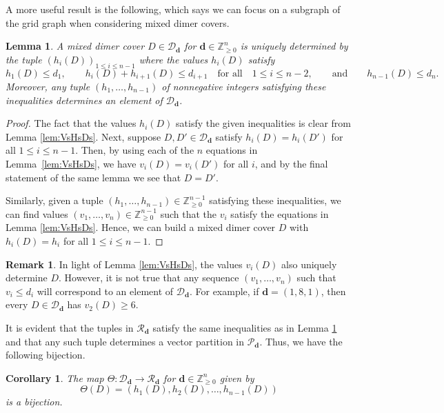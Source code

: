 \documentclass{amsart}
\def\bfd{{\mathbf{d}}}
\newtheorem{corollary}[theorem]{Corollary}
\newtheorem{lemma}[theorem]{Lemma}
\theoremstyle{definition}
\newtheorem{remark}[theorem]{Remark}
\begin{document}
A more useful result is the following, which says we can focus on a subgraph of the grid graph when considering mixed dimer covers.
 \begin{lemma}\label{lem:HoriztonalDeterminesMatching}
 A mixed dimer cover $D\in \mathcal{D}_{\mathbf{d}}$ for $\mathbf{d}\in\mathbb{Z}_{\ge 0}^n$ is uniquely determined by the tuple $(h_i(D))_{1 \leq i \leq n-1}$ where the values $h_i(D)$ satisfy \[h_1(D) \leq d_1, \qquad h_i(D) + h_{i+1}(D) \leq d_{i+1}\quad \text{for all}\quad 1 \leq i \leq n-2, \qquad \text{and} \qquad h_{n-1}(D) \leq d_n.
 \] Moreover, any tuple $(h_1,\ldots,h_{n-1})$ of nonnegative integers satisfying these inequalities determines an element of $\mathcal{D}_{\mathbf{d}}$.
 \end{lemma}

 \begin{proof}
The fact that the values $h_i(D)$ satisfy the given inequalities is clear from Lemma \ref{lem:VsHsDs}. Next, suppose $D,D' \in \mathcal{D}_{\mathbf{d}}$ satisfy $h_i(D) = h_i(D')$ for all $1 \leq i \leq n-1$. Then, by using each of the $n$ equations in Lemma~\ref{lem:VsHsDs}, we have $v_i(D) = v_i(D')$ for all $i$, and by the final statement of the same lemma we see that $D = D'$. 

Similarly, given a tuple $(h_1,\ldots,h_{n-1}) \in \mathbb{Z}_{\ge 0}^{n-1}$ satisfying these inequalities,
we can find values $(v_1,\ldots,v_n) \in \mathbb{Z}_{\ge 0}^{n-1}$ such that the $v_i$ satisfy the equations in Lemma \ref{lem:VsHsDs}. Hence, we can build a mixed dimer cover $D$ with $h_i(D) = h_i$ for all $1 \leq i \leq n-1$.
 \end{proof}

 \begin{remark}\label{rem:VsAlsoDetermine}
In light of Lemma \ref{lem:VsHsDs}, the values $v_i(D)$ also uniquely determine $D$. However, it is not true that any sequence $(v_1,\ldots,v_n)$ such that $v_i \leq d_i$ will correspond to an element of $\mathcal{D}_{\mathbf{d}}$. For example, if $\mathbf{d} = (1,8,1)$, then every $D \in \mathcal{D}_{\mathbf{d}}$ has $v_2(D) \geq 6$.
 \end{remark}

 It is evident that the tuples in $\mathcal{R}_{\mathbf{d}}$ satisfy the same inequalities as in Lemma \ref{lem:HoriztonalDeterminesMatching} and that any such tuple determines a vector partition in $\mathcal{P}_\mathbf{d}$. Thus, we have the following bijection.

\begin{corollary}\label{cor:naive_bijection}
    The map $\Theta:\mathcal{D}_{\bfd}\to\mathcal{R}_\bfd$ for $\bfd\in\mathbb{Z}^n_{\ge 0}$ given by \[\Theta(D)=(h_1(D),h_2(D),\ldots,h_{n-1}(D))\] is a bijection.
  
\end{corollary}
\end{document}

